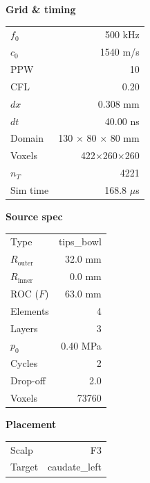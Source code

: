 \documentclass[11pt,letterpaper]{article}
\begin{document}
\begin{table}[h!]
\centering
\scriptsize
\setlength{\tabcolsep}{4pt}
\renewcommand{\arraystretch}{1.05}
\begin{minipage}[t]{0.32\linewidth}\centering
\textbf{Grid \& timing}\\[2pt]
\begin{tabular}{lr}
\toprule
$f_0$               & 500 kHz \\
$c_0$               & 1540 m/s \\
PPW                 & 10 \\
CFL                 & 0.20 \\
$dx$                & 0.308 mm \\
$dt$                & 40.00 ns \\
Domain              & 130 $\times$ 80 $\times$ 80 mm \\
Voxels              & 422$\times$260$\times$260 \\
$n_T$               & 4221 \\
Sim time            & 168.8 $\mu$s \\
\bottomrule
\end{tabular}
\end{minipage}\hfill
\begin{minipage}[t]{0.32\linewidth}\centering
\textbf{Source spec}\\[2pt]
\begin{tabular}{lr}
\toprule
Type             & tips\_bowl \\
$R_{\text{outer}}$ & 32.0 mm \\
$R_{\text{inner}}$ & 0.0 mm \\
ROC ($F$)        & 63.0 mm \\
Elements         & 4 \\
Layers           & 3 \\
$p_0$            & 0.40 MPa \\
Cycles           & 2 \\
Drop-off         & 2.0 \\
Voxels           & 73760 \\
\bottomrule
\end{tabular}
\end{minipage}\hfill
\begin{minipage}[t]{0.32\linewidth}\centering
\textbf{Placement}\\[2pt]
\begin{tabular}{lr}
\toprule
Scalp            & F3 \\
Target           & caudate\_left \\

\end{tabular}
\end{minipage}
\end{table}
\end{document}
